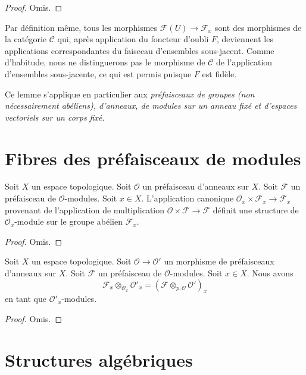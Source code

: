 \begin{proof}
Omis.
\end{proof}

\noindent
Par définition même, tous les morphismes $\mathcal{F}(U)
\to \mathcal{F}_x$ sont des morphismes de la catégorie $\mathcal{C}$
qui, après application du foncteur d'oubli $F$, deviennent
les applications correspondantes du faisceau d'ensembles sous-jacent.
Comme d'habitude, nous ne distinguerons pas le morphisme
de $\mathcal{C}$ de l'application d'ensembles sous-jacente, ce qui
est permis puisque $F$ est fidèle.

\medskip\noindent
Ce lemme s'applique en particulier aux
{\it préfaisceaux de groupes (non nécessairement abéliens), d'anneaux, de modules
sur un anneau fixé et d'espaces vectoriels sur un corps fixé}.

\section{Fibres des préfaisceaux de modules}
\label{section-stalk-presheaves-modules}

\begin{lemma}
\label{lemma-stalk-module}
Soit $X$ un espace topologique.
Soit $\mathcal{O}$ un préfaisceau d'anneaux sur $X$.
Soit $\mathcal{F}$ un préfaisceau de $\mathcal{O}$-modules.
Soit $x \in X$.
L'application canonique $\mathcal{O}_x \times \mathcal{F}_x
\to \mathcal{F}_x$ provenant de l'application de multiplication
$\mathcal{O} \times \mathcal{F} \to \mathcal{F}$ définit
une structure de $\mathcal{O}_x$-module sur le groupe abélien
$\mathcal{F}_x$.
\end{lemma}

\begin{proof}
Omis.
\end{proof}

\begin{lemma}
\label{lemma-stalk-tensor-presheaf-modules}
Soit $X$ un espace topologique.
Soit $\mathcal{O} \to \mathcal{O}'$ un morphisme de
préfaisceaux d'anneaux sur $X$.
Soit $\mathcal{F}$ un préfaisceau de $\mathcal{O}$-modules.
Soit $x \in X$. Nous avons
$$
\mathcal{F}_x \otimes_{\mathcal{O}_x} \mathcal{O}'_x
=
(\mathcal{F} \otimes_{p, \mathcal{O}} \mathcal{O}')_x
$$
en tant que $\mathcal{O}'_x$-modules.
\end{lemma}

\begin{proof}
Omis.
\end{proof}
\section{Structures algébriques}
\label{section-algebraic-structures}

